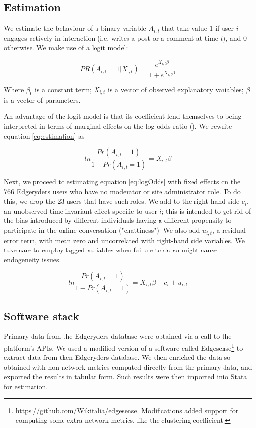 \subsection{Estimation}

We estimate the behaviour of a binary variable $A_{i,t}$ that take value $1$ if user $i$ engages actively in interaction (i.e. writes a post or a comment at time $t$), and $0$ otherwise. We make use of a logit model:

\begin{equation}
	PR(A_{i,t}= 1|X_{i,t}) = \frac{e^{X_{i,t}\beta}}{1 + e^{X_{i,t}\beta}}
	\label{eq:estimation}
\end{equation}

Where $\beta_0$ is a constant term; $X_{i,t}$ is a vector of observed explanatory variables; $\beta$ is a vector of parameters.

An advantage of the logit model is that its coefficient lend themselves to being interpreted in terms of marginal effects on the log-odds ratio (\cite{cameron2005econometrics}). We rewrite equation \ref{eq:estimation} as

\begin{equation}
	ln \frac{Pr(A_{i,t} = 1)}{1 - Pr(A_{i,t}=1)} = X_{i,t} \beta 
	\label{eq:logOdds}
\end{equation}

Next, we proceed to estimating equation \ref{eq:logOdds} with fixed effects on the 766 Edgeryders users who have no moderator or site administrator role. To do this, we drop the 23 users that have such roles. We add to the right hand-side
$c_i$, an unobserved time-invariant effect specific to user $i$; this is intended to get rid of the bias introduced by different individuals having a different propensity to participate in the online conversation ("chattiness"). We also add $u_{i,t}$, a residual error term, with mean zero and uncorrelated with right-hand side variables. We take care to employ lagged variables when failure to do so might cause endogeneity issues. 

\begin{equation}
	ln \frac{Pr(A_{i,t} = 1)}{1 - Pr(A_{i,t}=1)} = X_{i,t} \beta + c_i + u_{i,t}
	\label{eq:logOddsErrors}
\end{equation}

\subsection{Software stack}
Primary data from the Edgeryders database were obtained via a call to the platform's APIs. We used a modified version of a software called Edgesense\footnote{https://github.com/Wikitalia/edgesense. Modifications added support for computing some extra network metrics, like the clustering coefficient.} to extract data from then Edgeryders database. We then enriched the data so obtained with non-network metrics computed directly from the primary data, and exported the results in tabular form. Such results were then imported into Stata for estimation. 
